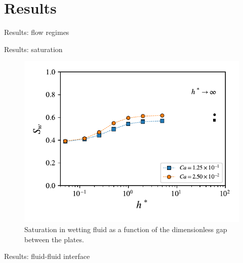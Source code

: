 \documentclass[presentation]{beamer}
\begin{document}
\section{Results}
\label{sec:org70e6955}

\begin{frame}[label={sec:org11bbfbb}]{Results: flow regimes}
\end{frame}
\begin{frame}[label={sec:orgbf39abd}]{Results: saturation}
\begin{figure}
\centering
\includegraphics[scale=0.8]{RESULTS_saturation.pdf}
\caption{Saturation in wetting fluid as a function of the dimensionless gap between the plates.}
\end{figure}
\end{frame}


\begin{frame}[label={sec:org98afb82}]{Results: fluid-fluid interface}
\end{frame}
\end{document}
